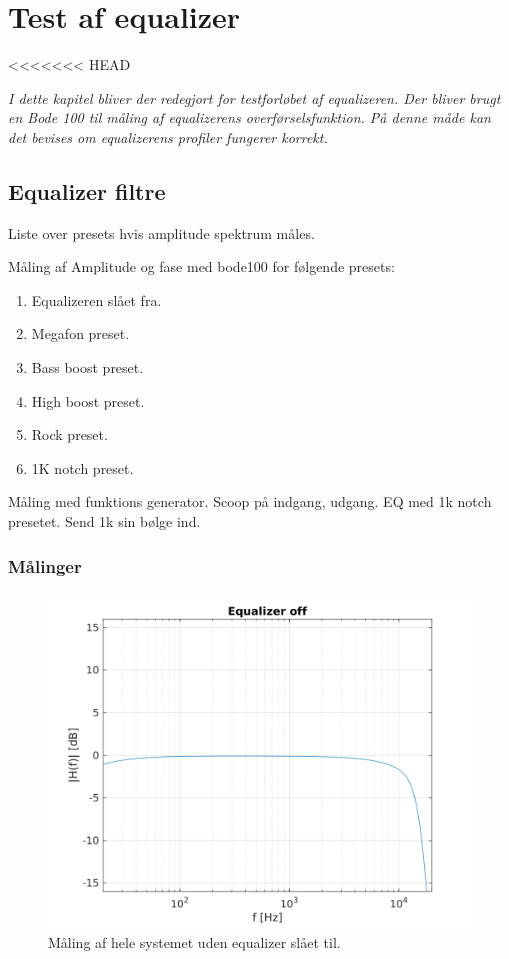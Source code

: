\chapter{Test af equalizer}\label{sec:test_eq}
<<<<<<< HEAD



\emph{I dette kapitel bliver der redegjort for testforløbet af equalizeren. Der bliver brugt en Bode 100 til måling af equalizerens overførselsfunktion. På denne måde kan det bevises om equalizerens profiler fungerer korrekt.}

\section{Equalizer filtre}


Liste over presets hvis amplitude spektrum måles.

Måling af Amplitude og fase med bode100 for følgende presets:
\begin{enumerate}
    \item Equalizeren slået fra.
    \item Megafon preset.
    \item Bass boost preset.
    \item High boost preset.
    \item Rock preset. 
    \item 1K notch preset.
\end{enumerate}

Måling med funktions generator. Scoop på indgang, udgang.
EQ med 1k notch presetet. 
Send 1k sin bølge ind. 


\subsection{Målinger}


\begin{figure}[h]
\centering
\includegraphics[]{matlabdemo/test/eq_off.png}  
\caption{Måling af hele systemet uden equalizer slået til.}
\end{figure}


